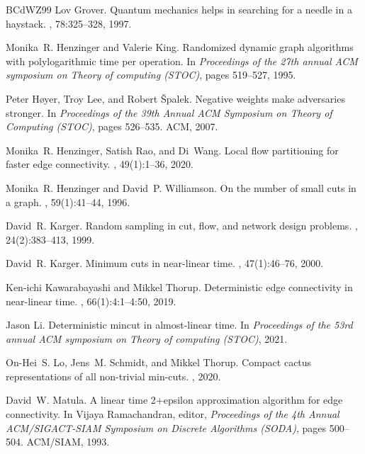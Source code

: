 \documentclass[10pt,a4paper]{article}
\newcommand{\1}{\mathbf{1}}
\theoremstyle{definition}
\begin{document}
\begin{thebibliography}{BCdWZ99}
Lov Grover.
\newblock Quantum mechanics helps in searching for a needle in a haystack.
, 78:325--328, 1997.

Monika~R. Henzinger and Valerie King.
\newblock Randomized dynamic graph algorithms with polylogarithmic time per
  operation.
\newblock In {\em Proceedings of the 27th annual ACM symposium on Theory of
  computing (STOC)}, pages 519--527, 1995.

Peter H{\o}yer, Troy Lee, and Robert {\v{S}}palek.
\newblock Negative weights make adversaries stronger.
\newblock In {\em Proceedings of the 39th Annual {ACM} Symposium on Theory of
  Computing (STOC)}, pages 526--535. {ACM}, 2007.

Monika~R. Henzinger, Satish Rao, and Di~Wang.
\newblock Local flow partitioning for faster edge connectivity.
, 49(1):1--36, 2020.

Monika~R. Henzinger and David~P. Williamson.
\newblock On the number of small cuts in a graph.
, 59(1):41--44, 1996.

David~R. Karger.
\newblock Random sampling in cut, flow, and network design problems.
, 24(2):383--413, 1999.

David~R. Karger.
\newblock Minimum cuts in near-linear time.
, 47(1):46--76, 2000.

Ken{-}ichi Kawarabayashi and Mikkel Thorup.
\newblock Deterministic edge connectivity in near-linear time.
, 66(1):4:1--4:50, 2019.

Jason Li.
\newblock Deterministic mincut in almost-linear time.
\newblock In {\em Proceedings of the 53rd annual ACM symposium on Theory of
  computing (STOC)}, 2021.

On-Hei~S. Lo, Jens~M. Schmidt, and Mikkel Thorup.
\newblock Compact cactus representations of all non-trivial min-cuts.
, 2020.

David~W. Matula.
\newblock A linear time 2+epsilon approximation algorithm for edge
  connectivity.
\newblock In Vijaya Ramachandran, editor, {\em Proceedings of the 4th Annual
  {ACM/SIGACT-SIAM} Symposium on Discrete Algorithms (SODA)}, pages 500--504.
  {ACM/SIAM}, 1993.


\end{thebibliography}
\end{document}

